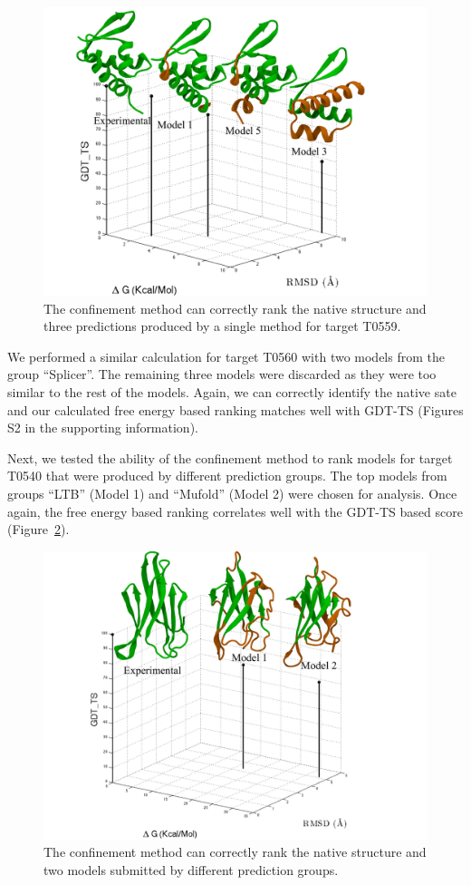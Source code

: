 \documentclass[12pt]{article}
\begin{document}
\begin{figure}
    \begin{center}
        \includegraphics[width=3.8 in]{T0559.pdf}
    \end{center}
    \caption{The confinement method can correctly rank the native structure and three predictions produced by a single
        method for target T0559.}
\label{fig:T0559}
\end{figure}

We performed a similar calculation for target T0560 with two models from the group ``Splicer''. The remaining three
models were discarded as they were too similar to the rest of the models. Again, we can correctly identify the native
sate and our calculated free energy based ranking matches well with GDT-TS (Figures S2 in the supporting information).



Next, we tested the ability of the confinement method to rank models for target T0540 that were produced by different
prediction groups. The top models from groups ``LTB'' (Model 1) and ``Mufold'' (Model 2) were chosen for analysis. Once
again, the free energy based ranking correlates well with the GDT-TS based score (Figure~\ref{fig:T0540}).

\begin{figure}
    \begin{center}
        \includegraphics[width=3.5 in]{T0540.pdf}
    \end{center}
    \caption{The confinement method can correctly rank the native structure and two models submitted by different
        prediction groups.}
\label{fig:T0540}
\end{figure}
\end{document}
